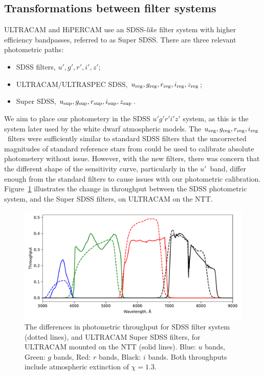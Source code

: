 \subsection{Transformations between filter systems}
\label{sect:observations:colour correction method}

ULTRACAM and HiPERCAM use an SDSS-\emph{like} filter system with higher efficiency bandpasses, referred to as Super SDSS. There are three relevant photometric paths:
\begin{itemize}
\item SDSS filters, $u', g', r', i', z'$;
\item ULTRACAM/ULTRASPEC SDSS, $u_{\rm reg}, g_{\rm reg}, r_{\rm reg}, i_{\rm reg}, z_{\rm reg}$;
\item Super SDSS, $u_{\rm sup}, g_{\rm sup}, r_{\rm sup}, i_{\rm sup}, z_{\rm sup}$.
\end{itemize}

We aim to place our photometery in the SDSS $u'g'r'i'z'$ system, as this is the system later used by the white dwarf atmospheric models. The $u_{\rm reg}, g_{\rm reg}, r_{\rm reg}, i_{\rm reg}$\ filters were sufficiently similar to standard SDSS filters that the uncorrected magnitudes of standard reference stars from \citet{smith2002} could be used to calibrate absolute photometery without issue. However, with the new filters, there was concern that the different shape of the sensitivity curve, particularly in the $u'$\ band, differ enough from the standard filters to cause issues with our photometric calibration. Figure~\ref{fig:sdss vs super filters} illustrates the change in throughput between the SDSS photometric system, and the Super SDSS filters, on ULTRACAM on the NTT. 

\begin{figure}
    \centering
    \includegraphics[width=\columnwidth]{figures/three_cvs_with_weird_colours/GeneralFigs/bandpass_diffs_SDSS_dots_UCAMNTT_solid.pdf}
    \caption{The differences in photometric throughput for SDSS filter system (dotted lines), and ULTRACAM Super SDSS filters, for ULTRACAM mounted on the NTT (solid lines). Blue: $u$ bands, Green: $g$ bands, Red: $r$ bands, Black: $i$ bands. Both throughputs include atmospheric extinction of $\chi = 1.3$.}
    \label{fig:sdss vs super filters}
\end{figure}

